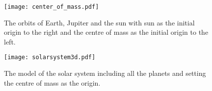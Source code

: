 \begin{figure}[htbp]
	\centering
	\texttt{[image: center\_of\_mass.pdf]}
	\caption{The orbits of Earth, Jupiter and the sun with sun as the initial origin to the right and the centre of mass as the initial origin to the left.}
	\label{fig:centre of mass}
\end{figure}

\begin{figure}[htbp]
	\centering
	\texttt{[image: solarsystem3d.pdf]}
	\caption{The model of the solar system including all the planets and setting the centre of mass as the origin.}
	\label{fig:solar system}
\end{figure}
